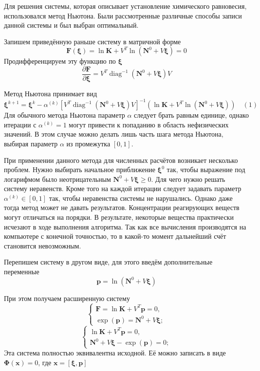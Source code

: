 \documentclass[14pt,a4paper]{extarticle}
\newcommand{\diag}{\operatorname{diag}}
\renewcommand{\vec}[1]{\boldsymbol{\mathbf{#1}}}
\renewcommand{\geq}{\geqslant}
\begin{document}
Для решения системы, которая описывает установление химического равновесия, использовался метод Ньютона. Были рассмотренные различные способы записи данной системы и был выбран оптимальный.

Запишем приведённую раньше систему в матричной форме$$\vec{F}(\vec \xi) = \ln{\vec{K}} + V^T \ln{(\vec{N}^0 + V\vec \xi)} = 0$$
Продифференцируем эту функцию по $\vec \xi$
$$\frac{\partial \vec{F}}{\partial{\vec{\xi}}} = V^T\diag^{-1}(\vec{N}^0 + V\vec{\xi})V$$

Метод Ньютона принимает вид
$$\vec{\xi}^{k+1} = \vec{\xi}^{k} - \alpha^{(k)}[V^T\diag^{-1}(\vec{N}^0 + V\vec{\xi})V]^{-1}(\ln{\vec{K}} + V^T \ln{(\vec{N}^0 + V\vec{\xi})}) \quad (1)$$
Для обычного метода Ньютона параметр $\alpha$ следует брать равным единице, однако итерации с $\alpha^{(k)} = 1$ могут привести к попаданию в область нефизических значений. В этом случае можно делать лишь часть шага метода Ньютона, выбирая параметр $\alpha$ из промежутка $[0, 1]$.   

При применении данного метода для численных расчётов возникает несколько проблем. Нужно выбирать начальное приближение $\vec{\xi}^0$ так, чтобы выражение под логарифмом было неотрицательным $\vec{N}^0 + V\vec{\xi}\geq 0$. Для чего нужно решать систему неравенств. Кроме того на каждой итерации следует задавать параметр $\alpha^{(k)} \in [0,1]$ так, чтобы неравенства системы не нарушались. Однако даже тогда метод может не давать результатов. Концентрации реагирующих веществ могут отличаться на порядки. В результате, некоторые вещества практически исчезают в ходе выполнения алгоритма. Так как все вычисления производятся на компьютере с конечной точностью, то в какой-то момент дальнейший счёт становится невозможным.

Перепишем систему в другом виде, для этого введём дополнительные переменные $$\vec{p} = \ln{(\vec{N}^0 + V\vec{\xi})}$$ 

При этом получаем расширенную систему
$$\begin{cases} 
	\vec{F} = \ln{\vec{K}} + V^T\vec{p}=0,\\
	\exp(\vec{p})=\vec{N}^0 + V\vec{\xi};
	
\end{cases}$$
$$\begin{cases} 
	\ln{\vec{K}} + V^T\vec{p}=0,\\
	\vec{N}^0 + V\vec{\xi} - \exp(\vec{p}) = 0;
\end{cases}$$
Эта система полностью эквивалентна исходной. Её можно записать в виде
$\vec{\Phi}(\vec{x}) = 0$, где $ \vec{x} = [\vec{\xi}, \vec{p}]$
\end{document}
